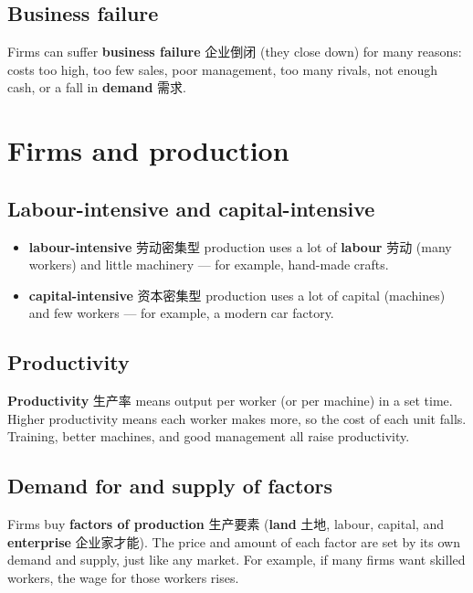 \documentclass[11pt]{article}
\begin{document}
\subsection*{Business failure}

Firms can suffer \textbf{business failure} 企业倒闭 (they close down) for many reasons: costs too high, too few sales, poor management, too many rivals, not enough cash, or a fall in \textbf{demand} 需求.

\section*{Firms and production}

\subsection*{Labour-intensive and capital-intensive}

\begin{itemize}
\item \textbf{labour-intensive} 劳动密集型 production uses a lot of \textbf{labour} 劳动 (many workers) and little machinery — for example, hand-made crafts.

\item \textbf{capital-intensive} 资本密集型 production uses a lot of capital (machines) and few workers — for example, a modern car factory.

\end{itemize}

\subsection*{Productivity}

\textbf{Productivity} 生产率 means output per worker (or per machine) in a set time. Higher productivity means each worker makes more, so the cost of each unit falls. Training, better machines, and good management all raise productivity.

\subsection*{Demand for and supply of factors}

Firms buy \textbf{factors of production} 生产要素 (\textbf{land} 土地, labour, capital, and \textbf{enterprise} 企业家才能). The price and amount of each factor are set by its own demand and supply, just like any market. For example, if many firms want skilled workers, the wage for those workers rises.
\end{document}
